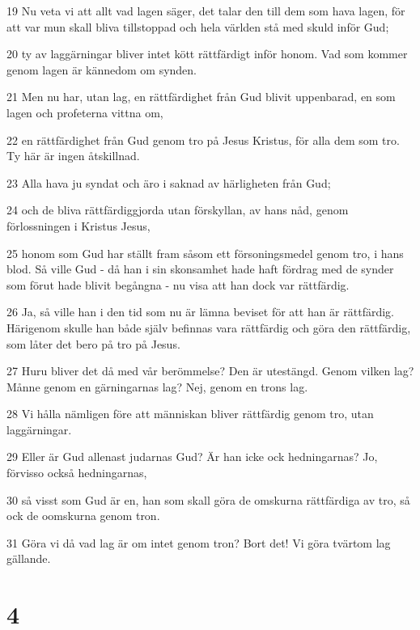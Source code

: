 \par 19 Nu veta vi att allt vad lagen säger, det talar den till dem som hava lagen, för att var mun skall bliva tillstoppad och hela världen stå med skuld inför Gud;
\par 20 ty av laggärningar bliver intet kött rättfärdigt inför honom. Vad som kommer genom lagen är kännedom om synden.
\par 21 Men nu har, utan lag, en rättfärdighet från Gud blivit uppenbarad, en som lagen och profeterna vittna om,
\par 22 en rättfärdighet från Gud genom tro på Jesus Kristus, för alla dem som tro. Ty här är ingen åtskillnad.
\par 23 Alla hava ju syndat och äro i saknad av härligheten från Gud;
\par 24 och de bliva rättfärdiggjorda utan förskyllan, av hans nåd, genom förlossningen i Kristus Jesus,
\par 25 honom som Gud har ställt fram såsom ett försoningsmedel genom tro, i hans blod. Så ville Gud - då han i sin skonsamhet hade haft fördrag med de synder som förut hade blivit begångna - nu visa att han dock var rättfärdig.
\par 26 Ja, så ville han i den tid som nu är lämna beviset för att han är rättfärdig. Härigenom skulle han både själv befinnas vara rättfärdig och göra den rättfärdig, som låter det bero på tro på Jesus.
\par 27 Huru bliver det då med vår berömmelse? Den är utestängd. Genom vilken lag? Månne genom en gärningarnas lag? Nej, genom en trons lag.
\par 28 Vi hålla nämligen före att människan bliver rättfärdig genom tro, utan laggärningar.
\par 29 Eller är Gud allenast judarnas Gud? Är han icke ock hedningarnas? Jo, förvisso också hedningarnas,
\par 30 så visst som Gud är en, han som skall göra de omskurna rättfärdiga av tro, så ock de oomskurna genom tron.
\par 31 Göra vi då vad lag är om intet genom tron? Bort det! Vi göra tvärtom lag gällande.

\chapter{4}

